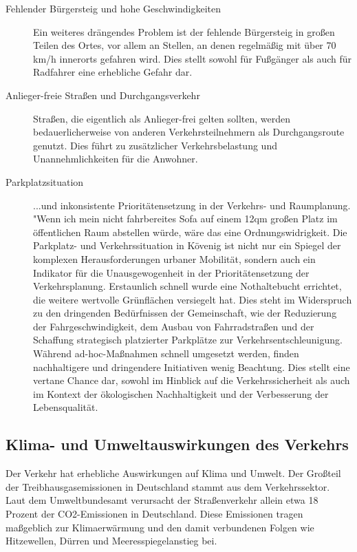 \begin{description}
  \item[Fehlender Bürgersteig und hohe Geschwindigkeiten]
  Ein weiteres drängendes Problem ist der fehlende Bürgersteig in großen Teilen des Ortes, vor allem an Stellen, an denen regelmäßig mit über 70 km/h innerorts gefahren wird. Dies stellt sowohl für Fußgänger als auch für Radfahrer eine erhebliche Gefahr dar.

  \item[Anlieger-freie Straßen und Durchgangsverkehr]
  Straßen, die eigentlich als Anlieger-frei gelten sollten, werden bedauerlicherweise von anderen Verkehrsteilnehmern als Durchgangsroute genutzt. Dies führt zu zusätzlicher Verkehrsbelastung und Unannehmlichkeiten für die Anwohner.

  \item[Parkplatzsituation]
  ...und inkonsistente Prioritätensetzung in der Verkehrs- und Raumplanung.
  "Wenn ich mein nicht fahrbereites Sofa auf einem 12qm großen Platz im öffentlichen Raum abstellen würde, wäre das eine Ordnungswidrigkeit.\cite{diehl2022autokorrektur}
  Die Parkplatz- und Verkehrssituation in Kövenig ist nicht nur ein Spiegel der komplexen Herausforderungen urbaner Mobilität, sondern auch ein Indikator für die Unausgewogenheit in der Prioritätensetzung der Verkehrsplanung. Erstaunlich schnell wurde eine Nothaltebucht errichtet, die weitere wertvolle Grünflächen versiegelt hat. Dies steht im Widerspruch zu den dringenden Bedürfnissen der Gemeinschaft, wie der Reduzierung der Fahrgeschwindigkeit, dem Ausbau von Fahrradstraßen und der Schaffung strategisch platzierter Parkplätze zur Verkehrsentschleunigung. Während ad-hoc-Maßnahmen schnell umgesetzt werden, finden nachhaltigere und dringendere Initiativen wenig Beachtung. Dies stellt eine vertane Chance dar, sowohl im Hinblick auf die Verkehrssicherheit als auch im Kontext der ökologischen Nachhaltigkeit und der Verbesserung der Lebensqualität.
\end{description}
\subsection{Klima- und Umweltauswirkungen des Verkehrs}
  Der Verkehr hat erhebliche Auswirkungen auf Klima und Umwelt. Der Großteil der Treibhausgasemissionen in Deutschland stammt aus dem Verkehrssektor. Laut dem Umweltbundesamt verursacht der Straßenverkehr allein etwa 18 Prozent der CO2-Emissionen in Deutschland\cite{web:umweltamt:nichtinvestiv}. Diese Emissionen tragen maßgeblich zur Klimaerwärmung und den damit verbundenen Folgen wie Hitzewellen, Dürren und Meeresspiegelanstieg bei.

